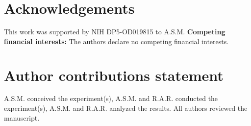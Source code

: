 \section{Acknowledgements}

This work was supported by NIH DP5-OD019815 to A.S.M. \textbf{Competing financial interests:} The authors declare no competing financial interests.

\section{Author contributions statement}

A.S.M. conceived the experiment(s),  A.S.M. and R.A.R. conducted the experiment(s), A.S.M. and R.A.R. analyzed the results.  All authors reviewed the manuscript.